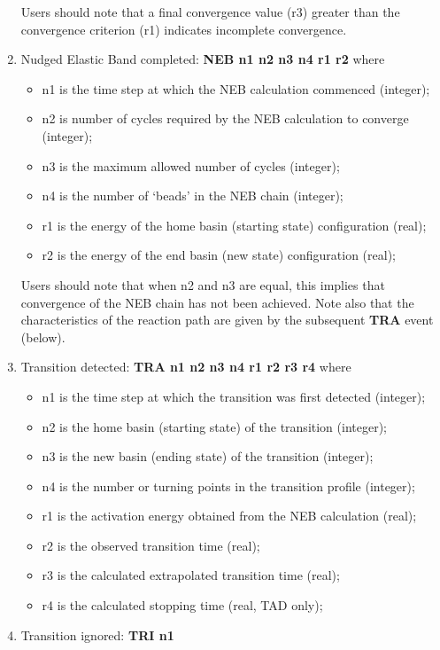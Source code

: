 \begin{enumerate}
\begin{itemize}
\end{itemize}
Users should note that a final convergence value (r3) greater than the
convergence criterion (r1) indicates incomplete convergence.
\item Nudged Elastic Band completed: {\bf NEB n1 n2 n3 n4 r1 r2} \newline
where
\begin{itemize}
\item n1 is the time step at which the NEB calculation commenced (integer);
\item n2 is number of cycles required by the NEB calculation to converge (integer);
\item n3 is the maximum allowed number of cycles (integer);
\item n4 is the number of `beads' in the NEB chain (integer);
\item r1 is the energy of the home basin (starting state) configuration (real);
\item r2 is the energy of the end basin (new state) configuration (real);
\end{itemize}
Users should note that when n2 and n3 are equal, this implies that
convergence of the NEB chain has not been achieved. Note also that the
characteristics of the reaction path are given by the subsequent {\bf
TRA} event (below).
\item Transition detected: {\bf TRA n1 n2 n3 n4 r1 r2 r3 r4} \newline
where
\begin{itemize}
\item n1 is the time step at which the transition was first detected (integer);
\item n2 is the home basin (starting state) of the transition (integer);
\item n3 is the new basin (ending state) of the transition (integer);
\item n4 is the number or turning points in the transition profile (integer);
\item r1 is the activation energy obtained from the NEB calculation (real);
\item r2 is the observed transition time (real);
\item r3 is the calculated extrapolated transition time (real);
\item r4 is the calculated stopping time (real, TAD only);
\end{itemize}
\item Transition ignored: {\bf TRI n1} \newline

\end{enumerate}
